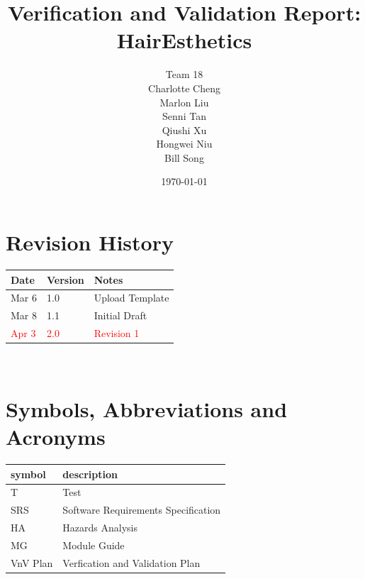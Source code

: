 \documentclass[12pt, oneside, openany, titlepage]{article}
\begin{document}
\title{Verification and Validation Report: HairEsthetics} 
\author{Team 18 \\ Charlotte Cheng
        \\ Marlon Liu
        \\ Senni Tan
        \\ Qiushi Xu
        \\ Hongwei Niu
        \\ Bill Song}
\date{\today}
	
\maketitle


\section{Revision History}

\begin{tabularx}{\textwidth}{p{3cm}p{2cm}X}
\toprule {\bf Date} & {\bf Version} & {\bf Notes}\\
\midrule
Mar 6 & 1.0 & Upload Template\\
Mar 8 & 1.1 & Initial Draft\\
\textcolor{red}{Apr 3} & \textcolor{red}{2.0} & \textcolor{red}{Revision 1}\\
\bottomrule
\end{tabularx}

~\newpage

\section{Symbols, Abbreviations and Acronyms}

\renewcommand{\arraystretch}{1.2}
\begin{tabular}{l l} 
  \toprule		
  \textbf{symbol} & \textbf{description}\\
  \midrule 
  T & Test\\
  SRS & Software Requirements Specification\\
  HA & Hazards Analysis\\
  MG & Module Guide\\
  VnV Plan & Verfication and Validation Plan \\
  \bottomrule
\end{tabular}\\

\newpage
\end{document}
